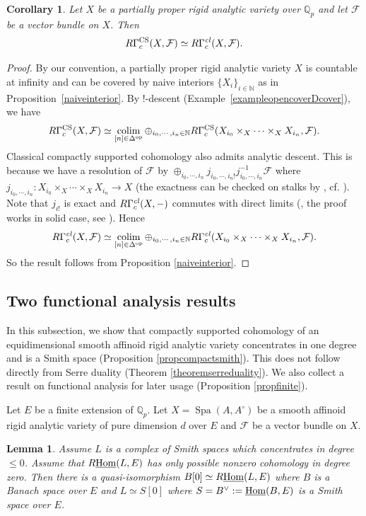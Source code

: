 \documentclass[a4paper,10pt]{amsart}
\theoremstyle{remark}
\theoremstyle{definition}
\theoremstyle{plain}
\newtheorem{lemma}[theorem]{Lemma}
\newtheorem{corollary}[theorem]{Corollary}
\numberwithin{equation}{section}
\newcommand{\bbN}{{\mathbb N}}
\newcommand{\bbQ}{{\mathbb Q}}
\newcommand{\calF}{{\mathcal F}}
\newcommand{\Hom}{{\rm Hom}}
\newcommand{\uHom}{\underline{\Hom}}
\newcommand{\CS}{\ensuremath{\mathrm{CS}}}
\DeclareMathOperator{\Spa}{Spa}
\DeclareMathOperator{\colim}{colim}
\begin{document}
\begin{corollary}\label{corocoincide}
	Let $X$ be a partially proper rigid analytic variety over $\bbQ_p$ and let $\calF$ be a vector bundle on $X$. Then
	$$R\Gamma^{\CS}_c(X,\calF)\simeq R\Gamma^{\it cl}_c(X,\calF).$$
\end{corollary}
\begin{proof}
	By our convention, a partially proper rigid analytic variety $X$ is countable at infinity and can be covered by naive interiors $\{X_i\}_{i\in \bbN}$ as in Proposition~\ref{naiveinterior}. By $!$-descent (Example~\ref{exampleopencoverDcover}), we have
	$$R\Gamma_c^{\CS}(X,\calF)\simeq \colim_{[n]\in \Delta^{\rm op}} \oplus_{i_0,\cdots,i_n\in \bbN} R\Gamma_c^{\CS}(X_{i_0}\times_X \cdots \times_X X_{i_n},\calF).$$
	Classical compactly supported cohomology also admits analytic descent. This is because we have a resolution of $\calF$ by $\oplus_{i_0,\cdots,i_n} j_{i_0,\cdots,i_n!}j^{-1}_{i_0,\cdots,i_n}\calF$ where $j_{i_0,\cdots,i_n}:X_{i_0}\times_X\cdots\times_X X_{i_n}\rightarrow X$ (the exactness can be checked on stalks by \cite[Cor.~A.10]{li2026locallyanalyticvectorscompleted}, cf. \cite[\S~4.7]{abeLazda2025proper}). Note that $j_{i!}$ is exact and $R\Gamma^{\it cl}_c(X,-)$ commutes with direct limits (\cite[Cor. 4.11]{abeLazda2025proper}, the proof works in solid case, see \cite[proof of Lemma A.21]{li2026locallyanalyticvectorscompleted}). Hence
	$$R\Gamma_c^{\it cl}(X,\calF)\simeq \colim_{[n]\in\Delta^{\rm op}} \oplus_{i_0,\cdots,i_n\in \bbN}R\Gamma_c^{\it cl}(X_{i_0}\times_X \cdots \times_X X_{i_n},\calF).$$
	So the result follows from Proposition \ref{naiveinterior}.
\end{proof}


\subsection{Two functional analysis results}\label{subsectionfunctionalanalysis}

In this subsection, we show that compactly supported cohomology of an equidimensional smooth affinoid rigid analytic variety concentrates in one degree and is a Smith space (Proposition \ref{propcompactsmith}). This does not follow directly from Serre duality (Theorem \ref{theoremserreduality}). We also collect a result on functional analysis for later usage (Proposition \ref{propfinite}).

Let $E$ be a finite extension of $\bbQ_p$. Let $X=\Spa(A,A^\circ)$ be a smooth affinoid rigid analytic variety of pure dimension $d$ over $E$ and $\calF$ be a vector bundle on $X$. 
\begin{lemma}\label{lemmaconserve}
 	Assume $L$ is a complex of Smith spaces which concentrates in degree $\leq 0$. Assume that $R\uHom(L,E)$ has only possible nonzero cohomology in degree zero. Then there is a quasi-isomorphism $B[0]\simeq R\uHom(L,E)$ where $B$ is a Banach space over $E$ and $L\simeq S[0]$ where $S=B^{\vee}:=\underline{\Hom}(B,E)$ is a Smith space over $E$.
 \end{lemma}
 
\end{document}
